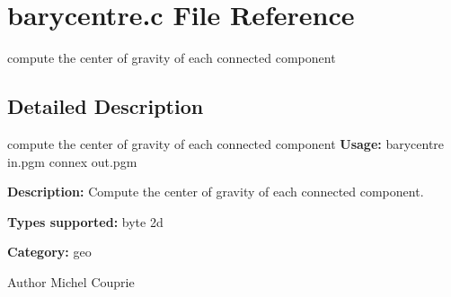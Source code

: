 \section{barycentre.c File Reference}
\label{barycentre_8c}


compute the center of gravity of each connected component  




\subsection{Detailed Description}
compute the center of gravity of each connected component {\bfseries Usage:} barycentre in.pgm connex out.pgm

{\bfseries Description:} Compute the center of gravity of each connected component.

{\bfseries Types supported:} byte 2d

{\bfseries Category:} geo

\begin{DoxyAuthor}{Author}
Michel Couprie 
\end{DoxyAuthor}
